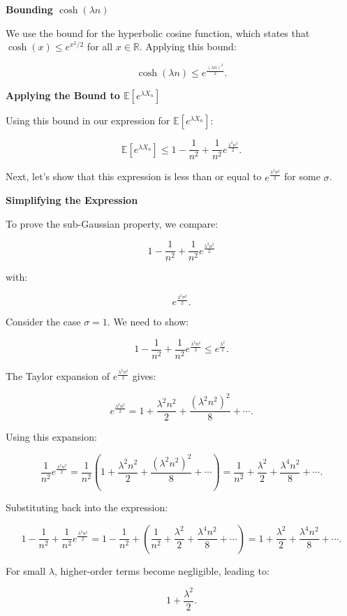 \documentclass[a4 paper]{article}
\theoremstyle{boldStyle}
\theoremstyle{boldBlueStyle}
\theoremstyle{boldPurpleStyle}
\theoremstyle{boldRedStyle}
\begin{document}
\begin{enumerate}
\textbf{Bounding \(\cosh(\lambda n)\)}

We use the bound for the hyperbolic cosine function, which states that \(\cosh(x) \leq e^{x^2 / 2}\) for all \(x \in \mathbb{R}\). Applying this bound:

\[
\cosh(\lambda n) \leq e^{\frac{(\lambda n)^2}{2}}.
\]

\textbf{Applying the Bound to \(\mathbb{E}[e^{\lambda X_n}]\)}

Using this bound in our expression for \(\mathbb{E}[e^{\lambda X_n}]\):

\[
\mathbb{E}[e^{\lambda X_n}] \leq 1 - \frac{1}{n^2} + \frac{1}{n^2} e^{\frac{\lambda^2 n^2}{2}}.
\]

Next, let's show that this expression is less than or equal to \(e^{\frac{\lambda^2 \sigma^2}{2}}\) for some \(\sigma\).

\textbf{Simplifying the Expression}

To prove the sub-Gaussian property, we compare:

\[
1 - \frac{1}{n^2} + \frac{1}{n^2} e^{\frac{\lambda^2 n^2}{2}}
\]

with:

\[
e^{\frac{\lambda^2 \sigma^2}{2}}.
\]

Consider the case \(\sigma = 1\). We need to show:

\[
1 - \frac{1}{n^2} + \frac{1}{n^2} e^{\frac{\lambda^2 n^2}{2}} \leq e^{\frac{\lambda^2}{2}}.
\]

The Taylor expansion of \(e^{\frac{\lambda^2 n^2}{2}}\) gives:

\[
e^{\frac{\lambda^2 n^2}{2}} = 1 + \frac{\lambda^2 n^2}{2} + \frac{(\lambda^2 n^2)^2}{8} + \cdots.
\]

Using this expansion:

\[
\frac{1}{n^2} e^{\frac{\lambda^2 n^2}{2}} = \frac{1}{n^2} \left(1 + \frac{\lambda^2 n^2}{2} + \frac{(\lambda^2 n^2)^2}{8} + \cdots \right) =
\frac{1}{n^2} + \frac{\lambda^2}{2} + \frac{\lambda^4 n^2}{8} + \cdots.
\]

Substituting back into the expression:

\[
1 - \frac{1}{n^2} + \frac{1}{n^2} e^{\frac{\lambda^2 n^2}{2}} = 1 - \frac{1}{n^2} + \left(\frac{1}{n^2} + \frac{\lambda^2}{2} + \frac{\lambda^4 n^2}{8} + \cdots \right) =
1 + \frac{\lambda^2}{2} + \frac{\lambda^4 n^2}{8} + \cdots.
\]

For small \(\lambda\), higher-order terms become negligible, leading to:

\[
1 + \frac{\lambda^2}{2}.
\]


\end{enumerate}
\end{document}
